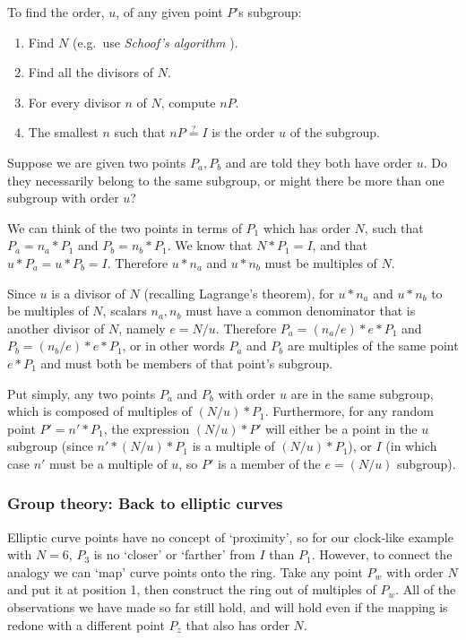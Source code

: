To find the order, $u$, of any given point $P$'s subgroup:
\begin{enumerate}
    \item Find $N$ (e.g.\ use {\em Schoof's algorithm} \cite{schoofs-algorithm}).
    \item Find all the divisors of $N$.
    \item For every divisor $n$ of $N$, compute $n P$.
    \item The smallest $n$ such that $n P \stackrel{?}{=} I$ is the order $u$ of the subgroup.
\end{enumerate} 

Suppose we are given two points $P_a, P_b$ and are told they both have order $u$. Do they necessarily belong to the same subgroup, or might there be more than one subgroup with order $u$?

We can think of the two points in terms of $P_1$ which has order $N$, such that $P_a = n_a*P_1$ and $P_b = n_b*P_1$. We know that $N*P_1 = I$, and that $u*P_a = u*P_b = I$. Therefore $u*n_a$ and $u*n_b$ must be multiples of $N$.

Since $u$ is a divisor of $N$ (recalling Lagrange's theorem), for $u*n_a$ and $u*n_b$ to be multiples of $N$, scalars $n_a, n_b$ must have a common denominator that is another divisor of $N$, namely $e = N/u$. Therefore $P_a = (n_a/e)*e*P_1$ and $P_b = (n_b/e)*e*P_1$, or in other words $P_a$ and $P_b$ are multiples of the same point $e*P_1$ and must both be members of that point's subgroup.

Put simply, any two points $P_a$ and $P_b$ with order $u$ are in the same subgroup, which is composed of multiples of $(N/u)* P_1$. Furthermore, for any random point $P' = n'*P_1$, the expression $(N/u)*P'$ will either be a point in the $u$ subgroup (since $n'*(N/u)*P_1$ is a multiple of $(N/u)*P_1$), or $I$ (in which case $n'$ must be a multiple of $u$, so $P'$ is a member of the $e = (N/u)$ subgroup).

\subsubsection{Group theory: Back to elliptic curves}

Elliptic curve points have no concept of `proximity', so for our clock-like example with $N = 6$, $P_3$ is no `closer' or `farther' from $I$ than $P_1$. However, to connect the analogy we can `map' curve points onto the ring. Take any point $P_w$ with order $N$ and put it at position 1, then construct the ring out of multiples of $P_w$. All of the observations we have made so far still hold, and will hold even if the mapping is redone with a different point $P_z$ that also has order $N$.

